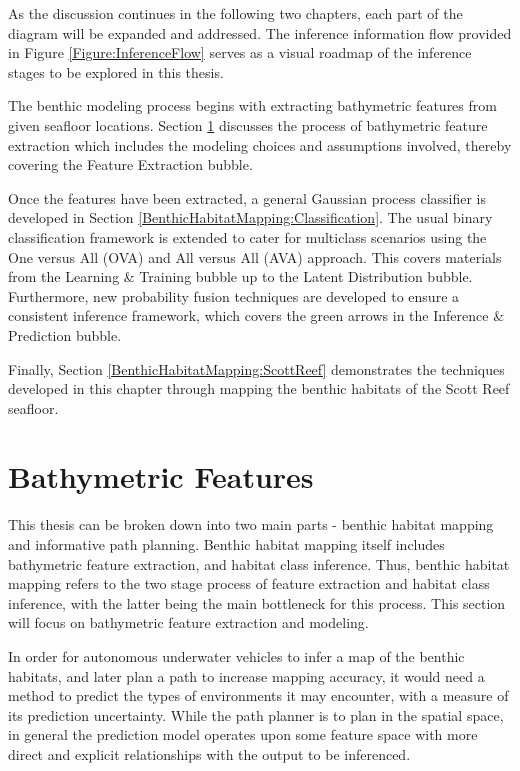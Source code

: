 	As the discussion continues in the following two chapters, each part of the diagram will be expanded and addressed. The inference information flow provided in Figure \ref{Figure:InferenceFlow} serves as a visual roadmap of the inference stages to be explored in this thesis.
		
	The benthic modeling process begins with extracting bathymetric features from given seafloor locations. Section \ref{BenthicHabitatMapping:BathymetricFeatures} discusses the process of bathymetric feature extraction which includes the modeling choices and assumptions involved, thereby covering the {\color{BurntOrange} Feature Extraction} bubble. 
	
	Once the features have been extracted, a general Gaussian process classifier is developed in Section \ref{BenthicHabitatMapping:Classification}. The usual binary classification framework is extended to cater for multiclass scenarios using the One versus All (OVA) and All versus All (AVA) approach. This covers materials from the {\color{Cyan} Learning \& Training} bubble up to the {\color{BlueViolet} Latent Distribution} bubble. Furthermore, new probability fusion techniques are developed to ensure a consistent inference framework, which covers the {\color{ForestGreen} green} arrows in the {\color{ForestGreen} Inference \& Prediction} bubble.
	
	Finally, Section \ref{BenthicHabitatMapping:ScottReef} demonstrates the techniques developed in this chapter through mapping the benthic habitats of the Scott Reef seafloor. 
		
	\section{Bathymetric Features}
	\label{BenthicHabitatMapping:BathymetricFeatures}
	
		This thesis can be broken down into two main parts - benthic habitat mapping and informative path planning. Benthic habitat mapping itself includes bathymetric feature extraction, and habitat class inference. Thus, benthic habitat mapping refers to the two stage process of feature extraction and habitat class inference, with the latter being the main bottleneck for this process. This section will focus on bathymetric feature extraction and modeling.
			
		In order for autonomous underwater vehicles to infer a map of the benthic habitats, and later plan a path to increase mapping accuracy, it would need a method to predict the types of environments it may encounter, with a measure of its prediction uncertainty. While the path planner is to plan in the spatial space, in general the prediction model operates upon some feature space with more direct and explicit relationships with the output to be inferenced.
		
